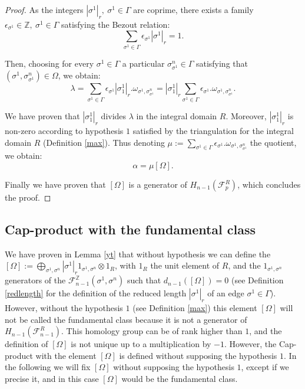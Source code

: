 \documentclass{article}
\begin{document}
\begin{proof}
    As the integers $|\sigma^1|_r, ~\sigma^1\in\Gamma$ are coprime, there exists a family $\epsilon_{\sigma^1} \in\mathbb{Z}, ~\sigma^1\in\Gamma$ satisfying the Bezout relation:
    \begin{equation*}
        \sum_{\sigma^1 \in \Gamma}\epsilon_{\sigma^1}|\sigma^1|_r = 1.
    \end{equation*}

    Then, choosing for every $\sigma^1\in\Gamma$ a particular $\sigma^n_{\sigma^1} \in \Gamma$ satisfying that $(\sigma^1,\sigma^n_{\sigma^1})\in\Omega$, we obtain:
    \begin{equation*}
        \lambda=\sum_{\sigma^1 \in \Gamma}\epsilon_{\sigma^1}|\sigma^1_1|_r.\omega_{\sigma^1,\sigma^n_{\sigma^1}} = |\sigma^1_1|_r\sum_{\sigma^1 \in \Gamma}\epsilon_{\sigma^1}.\omega_{\sigma^1,\sigma^n_{\sigma^1}}.
    \end{equation*}

    We have proven that $|\sigma^1_1|_r$ divides $\lambda$ in the integral domain $R$. Moreover, $|\sigma^1_1|_r$ is non-zero according to hypothesis $1$ satisfied by the triangulation for the integral domain $R$ (Definition \ref{max}). Thus denoting $\mu:= \sum_{\sigma^1 \in \Gamma}\epsilon_{\sigma^1}.\omega_{\sigma^1,\sigma^n_{\sigma^1}}$ the quotient, we obtain:
    \begin{equation*}
        \alpha = \mu[\Omega].
    \end{equation*}
    
    Finally we have proven that $[\Omega]$ is a generator of $H_{n-1}(\mathcal{F}_p^{R})$, which concludes the proof.
\end{proof}

\subsection{Cap-product with the fundamental class}

We have proven in Lemma \ref{yt} that without hypothesis we can define the $[\Omega]:=\bigoplus_{\sigma^1,\sigma^n} |\sigma^1|_r1_{\sigma^1,\sigma^n} \otimes 1_R$, with $1_R$ the unit element of $R$, and the $1_{\sigma^1,\sigma^n}$ generators of the $\mathcal{F}_{n-1}^{\mathbb{Z}}(\sigma^1,\sigma^n)$ such that $d_{n-1}([\Omega]) =0$ (see Definition \ref{redlength} for the definition of the reduced length $|\sigma^1|_r$ of an edge $\sigma^1\in\Gamma$). However, without the hypothesis $1$ (see Definition \ref{max}) this element $[\Omega]$ will not be called the fundamental class because it is not a generator of $H_{n-1}(\mathcal{F}_{n-1}^R)$. This homology group can be of rank higher than $1$, and the definition of $[\Omega]$ is not unique up to a multiplication by $-1$. However, the Cap-product with the element $[\Omega]$ is defined without supposing the hypothesis $1$. In the following we will fix $[\Omega]$ without supposing the hypothesis $1$, except if we precise it, and in this case $[\Omega]$ would be the fundamental class.
\end{document}
